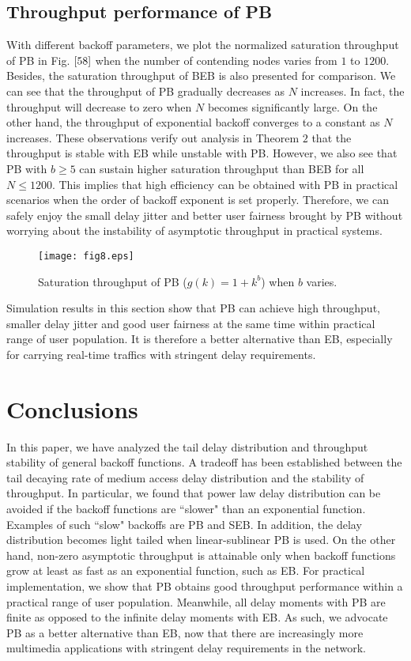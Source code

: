 \documentclass[journal]{IEEEtran}
\begin{document}
\subsection{Throughput performance of PB}
With different backoff parameters, we plot the normalized saturation throughput of PB in Fig. $\ref{58}$ when the number of contending nodes varies from $1$ to $1200$. Besides, the saturation throughput of BEB is also presented for comparison. We can see that the throughput of PB gradually decreases as $N$ increases. In fact, the throughput will decrease to zero when $N$ becomes significantly large. On the other hand, the throughput of exponential backoff converges to a constant as $N$ increases. These observations verify out analysis in Theorem $2$ that the throughput is stable with EB while unstable with PB. However, we also see that PB with $b\geq5$ can sustain higher saturation throughput than BEB for all $ N \leq 1200$. This implies that high efficiency can be obtained with PB in practical scenarios when the order of backoff exponent is set properly. Therefore, we can safely enjoy the small delay jitter and better user fairness brought by PB without worrying about the instability of asymptotic throughput in practical systems.

\begin{figure}
\centering
  \begin{center}
    \texttt{[image: fig8.eps]}
  \end{center}
  \caption{Saturation throughput of PB ($g(k)=1+k^b$) when $b$ varies.}
  \label{58}
\end{figure}

Simulation results in this section show that PB can achieve high throughput, smaller delay jitter and good user fairness at the same time within practical range of user population. It is therefore a better alternative than EB, especially for carrying real-time traffics with stringent delay requirements.

\section{Conclusions}
In this paper, we have analyzed the tail delay distribution and throughput stability of general backoff functions. A tradeoff has been established between the tail decaying rate of medium access delay distribution and the stability of throughput. In particular, we found that power law delay distribution can be avoided if the backoff functions are ``slower" than an exponential function. Examples of such ``slow" backoffs are PB and SEB. In addition, the delay distribution becomes light tailed when linear-sublinear PB is used. On the other hand, non-zero asymptotic throughput is attainable only when backoff functions grow at least as fast as an exponential function, such as EB. For practical implementation, we show that PB obtains good throughput performance within a practical range of user population. Meanwhile, all delay moments with PB are finite as opposed to the infinite delay moments with EB. As such, we advocate PB as a better alternative than EB, now that there are increasingly more multimedia applications with stringent delay requirements in the network.
\end{document}
